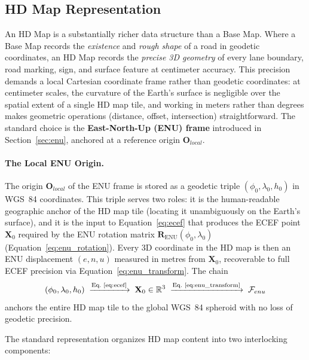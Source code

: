 \documentclass{book}
\begin{document}
\subsection{HD Map Representation}

An HD Map is a substantially richer data structure than a Base Map.
Where a Base Map records the \emph{existence} and \emph{rough shape}
of a road in geodetic coordinates, an HD Map records the
\emph{precise 3D geometry} of every lane boundary, road marking,
sign, and surface feature at centimeter accuracy.  This precision
demands a local Cartesian coordinate frame rather than geodetic
coordinates: at centimeter scales, the curvature of the Earth's
surface is negligible over the spatial extent of a single HD map
tile, and working in meters rather than degrees makes geometric
operations (distance, offset, intersection) straightforward.  The
standard choice is the \textbf{East-North-Up (ENU) frame}
introduced in Section~\ref{sec:enu}, anchored at a reference origin
$\mathbf{O}_{local}$.

\paragraph{The Local ENU Origin.}
The origin $\mathbf{O}_{local}$ of the ENU frame is stored as a
geodetic triple $(\phi_0, \lambda_0, h_0)$ in WGS~84 coordinates.
This triple serves two roles: it is the human-readable geographic
anchor of the HD map tile (locating it unambiguously on the Earth's
surface), and it is the input to Equation~\eqref{eq:ecef} that
produces the ECEF point $\mathbf{X}_0$ required by the ENU rotation
matrix $\mathbf{R}_{\text{ENU}}(\phi_0, \lambda_0)$
(Equation~\ref{eq:enu_rotation}).  Every 3D coordinate in the HD map
is then an ENU displacement $(e, n, u)$ measured in metres from
$\mathbf{X}_0$, recoverable to full ECEF precision via
Equation~\eqref{eq:enu_transform}.  The chain
\[
  (\phi_0, \lambda_0, h_0)
  \;\xrightarrow{\text{Eq.~\ref{eq:ecef}}}\;
  \mathbf{X}_0 \in \mathbb{R}^3
  \;\xrightarrow{\text{Eq.~\ref{eq:enu_transform}}}\;
  \mathcal{F}_{enu}
\]
anchors the entire HD map tile to the global WGS~84 spheroid with no
loss of geodetic precision.

The standard representation organizes HD map content into two
interlocking components:
\end{document}
